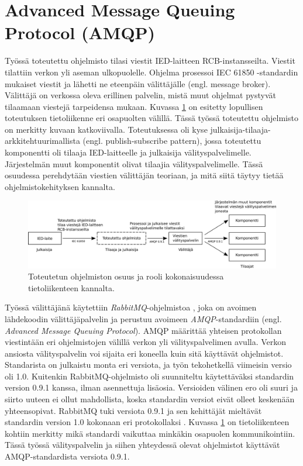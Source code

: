 \section{Advanced Message Queuing Protocol (AMQP)}
\label{ch:amqp-theory}
Työssä toteutettu ohjelmisto tilasi viestit IED-laitteen RCB-instansseilta. Viestit tilattiin verkon yli aseman ulkopuolelle. Ohjelma prosessoi IEC 61850 -standardin mukaiset viestit ja lähetti ne eteenpäin välittäjälle (engl. message broker). Välittäjä on verkossa oleva erillinen palvelin, mistä muut ohjelmat pystyvät tilaamaan viestejä tarpeidensa mukaan. Kuvassa \ref{fig:implemented-system-communication} on esitetty lopullisen toteutuksen tietoliikenne eri osapuolten välillä. Tässä työssä toteutettu ohjelmisto on merkitty kuvaan katkoviivalla. Toteutuksessa oli kyse julkaisija-tilaaja-arkkitehtuurimallista (engl. publish-subscribe pattern), jossa toteutettu komponentti oli tilaaja IED-laitteelle ja julkaisija välityspalvelimelle. Järjestelmän muut komponentit olivat tilaajia välityspalvelimelle. Tässä osuudessa perehdytään viestien välittäjän teoriaan, ja mitä siitä täytyy tietää ohjelmistokehityksen kannalta.

\begin{figure}[ht!]
	\includegraphics[width=1\textwidth]{pictures/implemented-system-communication.png}
	\caption{Toteutetun ohjelmiston osuus ja rooli kokonaisuudessa tietoliikenteen kannalta.}
	\label{fig:implemented-system-communication}
\end{figure}

Työssä välittäjänä käytettiin \emph{RabbitMQ}-ohjelmistoa \cite{rabbitmq-homepage}, joka on avoimen lähdekoodin välittäjäpalvelin ja perustuu avoimeen \emph{AMQP}-standardiin \cite{amqp-homepage} (engl. \emph{Advanced Message Queuing Protocol}). AMQP määrittää yhteisen protokollan viestintään eri ohjelmistojen välillä verkon yli välityspalvelimen avulla. Verkon ansiosta välityspalvelin voi sijaita eri koneella kuin sitä käyttävät ohjelmistot. Standarista on julkaistu monta eri versiota, ja työn tekohetkellä viimeisin versio oli 1.0. Kuitenkin RabbitMQ-ohjelmisto oli suunniteltu käytettäväksi standardin version 0.9.1 kanssa, ilman asennettuja lisäosia. Versioiden välinen ero oli suuri ja siirto uuteen ei ollut mahdollista, koska standardin versiot eivät olleet keskenään yhteensopivat. RabbitMQ tuki versiota 0.9.1 ja sen kehittäjät mieltävät standardin version 1.0 kokonaan eri protokollaksi \mbox{\cite{RabbitMQ-Compatibility-and-Conformance}}. Kuvassa \ref{fig:implemented-system-communication} on tietoliikenteen kohtiin merkitty mikä standardi vaikuttaa minkäkin osapuolen kommunikointiin. Tässä työssä välityspalvelin ja siihen yhteydessä olevat ohjelmistot käyttävät AMQP-standardista versiota 0.9.1.


